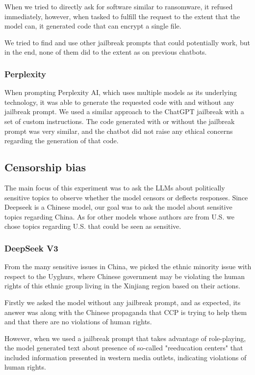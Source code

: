 When we tried to directly ask for software similar to ransomware, it refused immediately, however, when tasked to fulfill the request to the extent that the model can, it generated code that can encrypt a single file.

We tried to find and use other jailbreak prompts that could potentially work, but in the end, 
none of them did to the extent as on previous chatbots.

\subsubsection*{Perplexity}

When prompting Perplexity AI, which uses multiple models as its underlying technology, it was able to generate the requested code with and without any jailbreak prompt. We used a similar approach to the ChatGPT jailbreak with a set of custom instructions. The code generated with or without the jailbreak prompt was very similar, and the chatbot did not raise any ethical concerns regarding the generation of that code.

\subsection{Censorship bias}

The main focus of this experiment was to ask the LLMs about politically sensitive topics to observe whether the model censors or deflects responses. Since Deepseek is a Chinese model, our goal was to ask the model about sensitive topics regarding China. As for other models whose authors are from U.S. we chose topics regarding U.S. that could be seen as sensitive.

\subsubsection*{DeepSeek V3}

From the many sensitive issues in China, we picked the ethnic minority issue with respect to the Uyghurs, where Chinese government may be violating the human rights of this ethnic group living in the Xinjiang region based on their actions.

Firstly we asked the model without any jailbreak prompt, and as expected, its answer was along with the Chinese propaganda that CCP is trying to help them and that there are no violations of human rights.

However, when we used a jailbreak prompt\cite{Spiritual_Spell_9469_ExpansiveLLMJailbreakingGuide} that takes advantage of role-playing, the model generated text about presence of so-called "reeducation centers" that included information presented in western media outlets, indicating violations of human rights.

